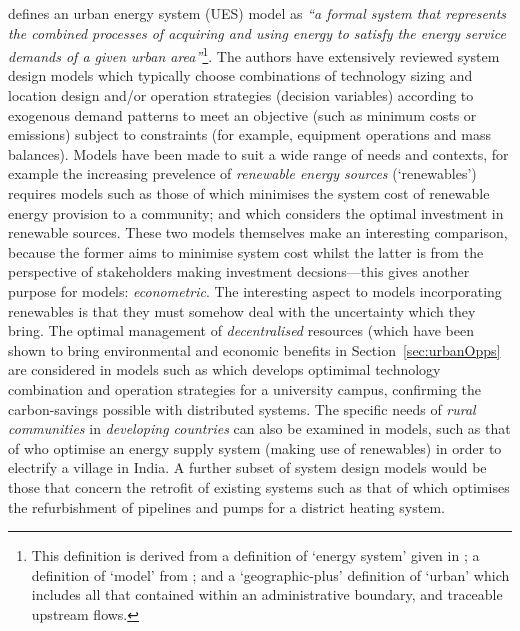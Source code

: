 \citet{Keirstead2012b} defines an urban energy system (UES) model as \emph{``a formal system that represents the combined processes of acquiring and using energy to satisfy the energy service demands of a given urban area''}\footnote{This definition is derived from a definition of `energy system' given in \citet{Jaccard2005}; a definition of `model' from \citet{Rosen2001}; and a `geographic-plus' definition of `urban' which includes all that contained within an administrative boundary, and traceable upstream flows.}. The authors have extensively reviewed system design models which typically choose combinations of technology sizing and location design and/or operation strategies (decision variables) according to exogenous demand patterns to meet an objective (such as minimum costs or emissions) subject to constraints (for example, equipment operations and mass balances). Models have been made to suit a wide range of needs and contexts, for example the increasing prevelence of \emph{renewable energy sources} (`renewables') requires models such as those of \citet{Cai2009a} which minimises the system cost of renewable energy provision to a community; and \citet{Fleten2005} which considers the optimal investment in renewable sources. These two models themselves make an interesting comparison, because the former aims to minimise system cost whilst the latter is from the perspective of stakeholders making investment decsions---this gives another purpose for models: \emph{econometric}. The interesting aspect to models incorporating renewables is that they must somehow deal with the uncertainty which they bring. The optimal management of \emph{decentralised} resources (which have been shown to bring environmental and economic benefits in Section~\ref{sec:urbanOpps} are considered in models such as \citet{Ren2010} which develops optimimal technology combination and operation strategies for a university campus, confirming the carbon-savings possible with distributed systems. The specific needs of \emph{rural communities} in \emph{developing countries} can also be examined in models, such as that of \citet{Kumaravel2012} who optimise an energy supply system (making use of renewables) in order to electrify a village in India. A further subset of system design models would be those that concern the retrofit of existing systems such as that of \citet{Bojic2010} which optimises the refurbishment of pipelines and pumps for a district heating system.

